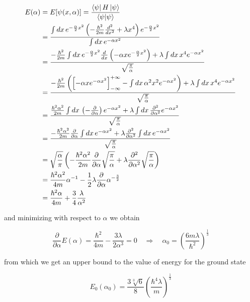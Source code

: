 \documentclass{article}
\begin{document}
\begin{align}
E(\alpha) & = E[\psi(x, \alpha)] = \frac{\bra{\psi} H \ket{\psi}}{\braket{\psi}{\psi}} \nonumber \\
& = \frac{\int dx \, e^{-\frac{\alpha}{2}x^2} \left( -\frac{\hbar^2}{2m} \frac{d^2}{dx^2} + \lambda x^4 \right) e^{-\frac{\alpha}{2}x^2}}{\int dx \, e^{-\alpha x^2}} \nonumber \\
& = \frac{-\frac{\hbar^2}{2m} \int dx \, e^{-\frac{\alpha}{2}x^2} \frac{d}{dx} \left(-\alpha x e^{-\frac{\alpha}{2}x^2} \right) + \lambda \int dx \, x^4 e^{-\alpha x^2}}{\sqrt{\frac{\pi}{\alpha}}} \nonumber \\
& = \frac{-\frac{\hbar^2}{2m} \left( \left[-\alpha x e^{-\alpha x^2} \right]_{-\infty}^{+\infty} - \int dx \, \alpha^2 x^2 e^{-\alpha x^2} \right) + \lambda \int dx \, x^4 e^{-\alpha x^2}}{\sqrt{\frac{\pi}{\alpha}}} \nonumber \\
& = \frac{\frac{\hbar^2\alpha^2}{2m} \int dx \, \left( -\frac{\partial}{\partial \alpha} \right) e^{-\alpha x^2} + \lambda \int dx \, \frac{\partial^2}{\partial \alpha^2} e^{-\alpha x^2}}{\sqrt{\frac{\pi}{\alpha}}} \nonumber \\
& = \frac{-\frac{\hbar^2\alpha^2}{2m} \frac{\partial}{\partial \alpha} \int dx \, e^{-\alpha x^2} + \lambda \frac{\partial^2}{\partial \alpha^2} \int dx \, e^{-\alpha x^2}}{\sqrt{\frac{\pi}{\alpha}}} \nonumber \\
& = \sqrt{\frac{\alpha}{\pi}} \left( -\frac{\hbar^2\alpha^2}{2m} \frac{\partial}{\partial \alpha} \sqrt{\frac{\pi}{\alpha}} + \lambda \frac{\partial^2}{\partial \alpha^2} \sqrt{\frac{\pi}{\alpha}} \right) \nonumber \\
& = \frac{\hbar^2\alpha^2}{4m}\alpha^{-1} -\frac{1}{2} \lambda \frac{\partial}{\partial \alpha} \alpha^{-\frac{3}{2}} \nonumber \\
& = \frac{\hbar^2\alpha}{4m} + \frac{3}{4} \frac{\lambda}{\alpha^2}
\end{align}

and minimizing with respect to \( \alpha \) we obtain

\begin{equation}
\frac{\partial}{\partial\alpha} E(\alpha) = \frac{\hbar^2}{4m} -\frac{3\lambda}{2\alpha^3} = 0 \quad \Rightarrow \quad \alpha_0 = \left( \frac{6m\lambda}{\hbar^2} \right)^{\frac{1}{3}}
\end{equation}

from which we get an upper bound to the value of energy for the ground state

\begin{equation}
E_0(\alpha_0) = \frac{3\sqrt[3]{6}}{8} \left( \frac{\hbar^4 \lambda}{m} \right)^{\frac{1}{3}}
\end{equation}
\end{document}
